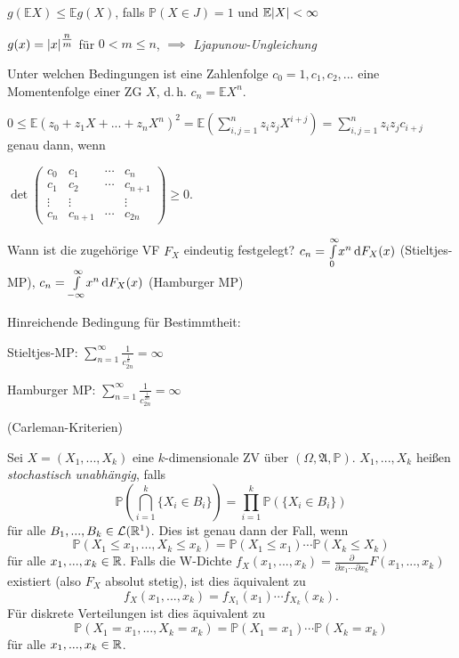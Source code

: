 \documentclass{cheat-sheet}
\newcommand{\Alg}{\mathfrak{A}} %
\renewcommand{\P}{\mathbb{P}}
\newcommand{\E}{\mathbb{E}} %
\begin{document}
\begin{satz}
  $g(\E X) \leq \E g(X)$, falls $\P(X \in J) = 1$ und $\E \abs{X} < \infty$
\end{satz}


$g(x) = \lvert x\rvert^{\tfrac{n}{m}}$ für $0 < m \leq n$, $\implies$ \emph{Ljapunow-Ungleichung}

\begin{problem}[Momentenproblem]
  Unter welchen Bedingungen ist eine Zahlenfolge $c_0 = 1, c_1, c_2, ...$ eine Momentenfolge einer ZG $X$, d.\,h. $c_n = \E X^n$.
\end{problem}

\begin{antwort}
  $0 \leq \E(z_0 + z_1 X + ... + z_n X^n)^2 = \E(\sum_{i,j=1}^n z_i z_j X^{i+j}) = \sum_{i,j=1}^n z_i z_j c_{i+j}$ genau dann, wenn

  $\det \begin{pmatrix} c_0 & c_1 & \cdots & c_n \\ c_1 & c_2 & \cdots & c_{n+1} \\ \vdots & \vdots & & \vdots \\ c_n & c_{n+1} & \cdots & c_{2n} \end{pmatrix} \geq 0$.
\end{antwort}

\begin{problem}
  Wann ist die zugehörige VF $F_X$ eindeutig festgelegt? $c_n = {\textstyle \int\limits_{0}^{\infty}} x^n \,\mathrm{d} F_X(x)$ (Stieltjes-MP), $c_n = {\textstyle \int\limits_{-\infty}^{\infty}} x^n \,\mathrm{d} F_X(x)$ (Hamburger MP)

  Hinreichende Bedingung für Bestimmtheit:

  Stieltjes-MP: $\sum_{n=1}^\infty \frac{1}{c_{2n}^{\tfrac{1}{n}}} = \infty$

  Hamburger MP: $\sum_{n=1}^\infty \frac{1}{c_{2n}^{\tfrac{1}{2n}}} = \infty$

  (Carleman-Kriterien)
\end{problem}




\begin{defn}
  Sei $X = (X_1, ..., X_k)$ eine $k$-dimensionale ZV über $(\Omega, \Alg, \P)$. $X_1, ..., X_k$ heißen \emph{stochastisch unabhängig}, falls
  \[ \P(\bigcap_{i=1}^k \{ X_i \in B_i \}) = \prod_{i=1}^k \P(\{ X_i \in B_i \}) \]
  für alle $B_1, ..., B_k \in \mathcal{L}(\mathbb{R}^1)$. Dies ist genau dann der Fall, wenn
  \[ \P(X_1 \leq x_1, ..., X_k \leq x_k) = \P(X_1 \leq x_1) \cdots \P(X_k \leq X_k) \]
  für alle $x_1, ..., x_k \in \mathbb{R}$. Falls die W-Dichte $f_X(x_1, ..., x_k) = \tfrac{\partial}{\partial x_1 \cdots \partial x_k} F(x_1, ..., x_k)$ existiert (also $F_X$ absolut stetig), ist dies äquivalent zu
  \[ f_X(x_1, ..., x_k) = f_{X_1}(x_1) \cdots f_{X_k}(x_k). \]
  Für diskrete Verteilungen ist dies äquivalent zu
  \[ \P(X_1 = x_1, ..., X_k = x_k) = \P(X_1 = x_1) \cdots \P(X_k = x_k) \]
  für alle $x_1, ..., x_k \in \mathbb{R}$.
\end{defn}
\end{document}
